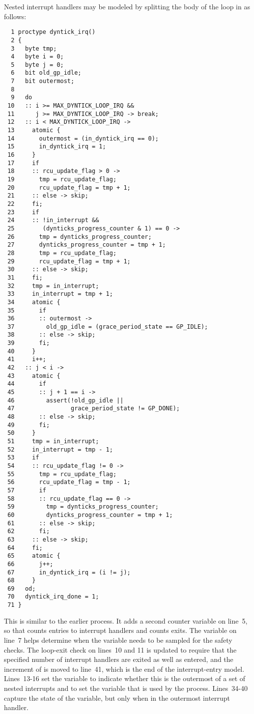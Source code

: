 Nested interrupt handlers may be modeled by splitting the body of
the loop in  as follows:

{ \scriptsize
\begin{verbatim}
  1 proctype dyntick_irq()
  2 {
  3   byte tmp;
  4   byte i = 0;
  5   byte j = 0;
  6   bit old_gp_idle;
  7   bit outermost;
  8
  9   do
 10   :: i >= MAX_DYNTICK_LOOP_IRQ &&
 11      j >= MAX_DYNTICK_LOOP_IRQ -> break;
 12   :: i < MAX_DYNTICK_LOOP_IRQ ->
 13     atomic {
 14       outermost = (in_dyntick_irq == 0);
 15       in_dyntick_irq = 1;
 16     }
 17     if
 18     :: rcu_update_flag > 0 ->
 19       tmp = rcu_update_flag;
 20       rcu_update_flag = tmp + 1;
 21     :: else -> skip;
 22     fi;
 23     if
 24     :: !in_interrupt &&
 25        (dynticks_progress_counter & 1) == 0 ->
 26       tmp = dynticks_progress_counter;
 27       dynticks_progress_counter = tmp + 1;
 28       tmp = rcu_update_flag;
 29       rcu_update_flag = tmp + 1;
 30     :: else -> skip;
 31     fi;
 32     tmp = in_interrupt;
 33     in_interrupt = tmp + 1;
 34     atomic {
 35       if
 36       :: outermost ->
 37         old_gp_idle = (grace_period_state == GP_IDLE);
 38       :: else -> skip;
 39       fi;
 40     }
 41     i++;
 42   :: j < i ->
 43     atomic {
 44       if
 45       :: j + 1 == i ->
 46         assert(!old_gp_idle ||
 47                grace_period_state != GP_DONE);
 48       :: else -> skip;
 49       fi;
 50     }
 51     tmp = in_interrupt;
 52     in_interrupt = tmp - 1;
 53     if
 54     :: rcu_update_flag != 0 ->
 55       tmp = rcu_update_flag;
 56       rcu_update_flag = tmp - 1;
 57       if
 58       :: rcu_update_flag == 0 ->
 59         tmp = dynticks_progress_counter;
 60         dynticks_progress_counter = tmp + 1;
 61       :: else -> skip;
 62       fi;
 63     :: else -> skip;
 64     fi;
 65     atomic {
 66       j++;
 67       in_dyntick_irq = (i != j);
 68     }
 69   od;
 70   dyntick_irq_done = 1;
 71 }
\end{verbatim}
}

This is similar to the earlier  process.
It adds a second counter variable  on line~5, so that
 counts entries to interrupt handlers and 
counts exits.
The  variable on line~7 helps determine
when the  variable needs to be sampled
for the safety checks.
The loop-exit check on lines~10 and 11 is updated to require that the
specified number of interrupt handlers are exited as well as entered,
and the increment of  is moved to line~41, which is
the end of the interrupt-entry model.
Lines~13-16 set the  variable to indicate
whether this is the outermost of a set of nested interrupts and to
set the  variable that is used by the
 process.
Lines~34-40 capture the state of the 
variable, but only when in the outermost interrupt handler.

